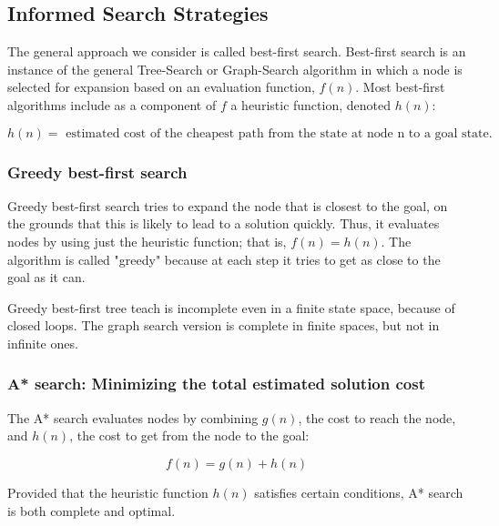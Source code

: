\documentclass{article}
\begin{document}
\subsection{Informed Search Strategies}

The general approach we consider is called best-first search. Best-first search is an instance of the general Tree-Search or Graph-Search algorithm in which a node is selected for expansion based on an evaluation function, $ f(n) $. Most best-first algorithms include as a component of $ f $ a heuristic function, denoted $ h(n) $:

$$ h(n) = \text{ estimated cost of the cheapest path from the state at node n to a goal state.} $$

\subsubsection{Greedy best-first search}

Greedy best-first search tries to expand the node that is closest to the goal, on the grounds that this is likely to lead to a solution quickly. Thus, it evaluates nodes by using just the heuristic function; that is, $ f(n) = h(n) $. The algorithm is called "greedy" because at each step it tries to get as close to the goal as it can.

Greedy best-first tree teach is incomplete even in a finite state space, because of closed loops. The graph search version is complete in finite spaces, but not in infinite ones.

\subsubsection{A* search: Minimizing the total estimated solution cost}

The A* search evaluates nodes by combining $ g(n) $, the cost to reach the node, and $ h(n) $, the cost to get from the node to the goal:

$$ f(n) = g(n) + h(n) $$

Provided that the heuristic function $ h(n) $ satisfies certain conditions, A* search is both complete and optimal.
\end{document}
